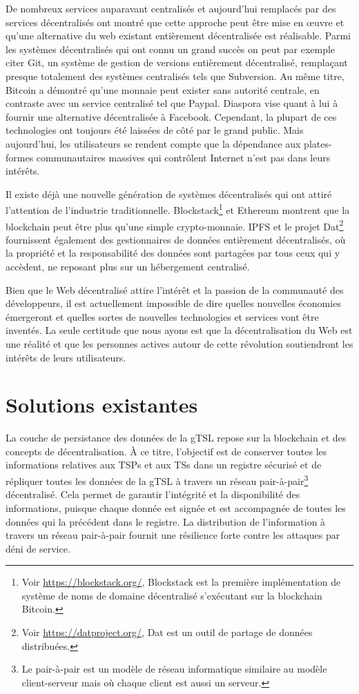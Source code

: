 \documentclass{tnreport}
\begin{document}
De nombreux services auparavant centralisés et aujourd'hui remplacés par des services décentralisés ont montré que cette approche peut être mise en œuvre et qu'une alternative du web existant entièrement décentralisée est réalisable. 
Parmi les systèmes décentralisés qui ont connu un grand succès on peut par exemple citer Git, un système de gestion de versions entièrement décentralisé, remplaçant presque totalement des systèmes centralisés tels que Subversion. 
Au même titre, Bitcoin a démontré qu'une monnaie peut exister sans autorité centrale, en contraste avec un service centralisé tel que Paypal. 
Diaspora vise quant à lui à fournir une alternative décentralisée à Facebook.
Cependant, la plupart de ces technologies ont toujours été laissées de côté par le grand public. Mais aujourd'hui, les utilisateurs se rendent compte que la dépendance aux plates-formes communautaires massives qui contrôlent Internet n'est pas dans leurs intérêts.

Il existe déjà une nouvelle génération de systèmes décentralisés qui ont attiré l'attention de l'industrie traditionnelle.
Blockstack\footnote{Voir \url{https://blockstack.org/}, Blockstack est la première implémentation de système de noms de domaine décentralisé s'exécutant sur la blockchain Bitcoin.} et Ethereum montrent que la blockchain peut être plus qu'une simple crypto-monnaie. IPFS et le projet Dat\footnote{Voir \url{https://datproject.org/}, Dat est un outil de partage de données distribuées.} fournissent également des gestionnaires de données entièrement décentralisés, où la propriété et la responsabilité des données sont partagées par tous ceux qui y accèdent, ne reposant plus sur un hébergement centralisé.

Bien que le Web décentralisé attire l'intérêt et la passion de la communauté des développeurs, il est actuellement impossible de dire quelles nouvelles économies émergeront et quelles sortes de nouvelles technologies et services vont être inventés. La seule certitude que nous ayons est que la décentralisation du Web est une réalité et que les personnes actives autour de cette révolution soutiendront les intérêts de leurs utilisateurs.

\section{Solutions existantes}
\label{sec:solutions}

La couche de persistance des données de la gTSL repose sur la blockchain et des concepts de décentralisation. À ce titre, l'objectif est de conserver toutes les informations relatives aux TSPs et aux TSs dans un registre sécurisé et de répliquer toutes les données de la gTSL à travers un réseau pair-à-pair\footnote{Le pair-à-pair est un modèle de réseau informatique similaire au modèle client-serveur mais où chaque client est aussi un serveur.} décentralisé.
Cela permet de garantir l'intégrité et la disponibilité des informations, puisque chaque donnée est signée et est accompagnée de toutes les données qui la précédent dans le registre. La distribution de l'information à travers un réseau pair-à-pair fournit une résilience forte contre les attaques par déni de service.
\end{document}
